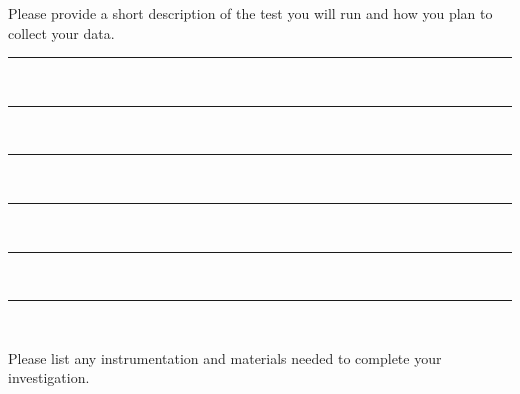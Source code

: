 \documentclass[12pt]{article}
\begin{document}
\begin{tcolorbox}[colback=mygray,colframe=black]
Please provide a short description of the test you will run and how you plan to collect your data. 
\end{tcolorbox}

\vspace{1em}
\rule{\textwidth}{0.4pt}\\[1.2em]
\rule{\textwidth}{0.4pt}\\[1.2em]
\rule{\textwidth}{0.4pt}\\[1.2em]
\rule{\textwidth}{0.4pt}\\[1.2em]
\rule{\textwidth}{0.4pt}\\[1.2em]
\rule{\textwidth}{0.4pt}\\[1.2em]

\begin{tcolorbox}[colback=mygray,colframe=black]
Please list any instrumentation and materials needed to complete your investigation.
\end{tcolorbox}
\end{document}
